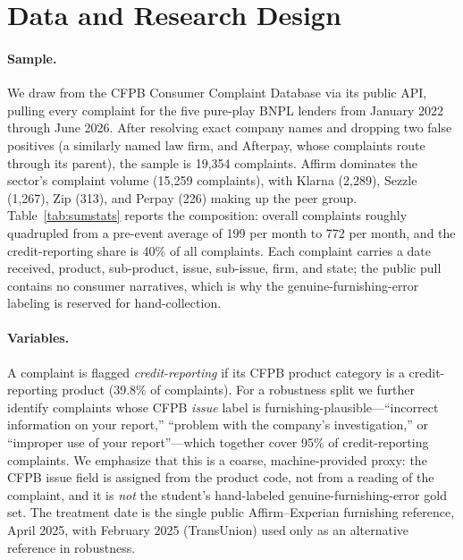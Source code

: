 \documentclass[12pt]{article}
\begin{document}
\section{Data and Research Design}\label{sec:data}
\paragraph{Sample.} We draw from the CFPB Consumer Complaint Database via its public API,
pulling every complaint for the five pure-play BNPL lenders from January 2022 through June
2026. After resolving exact company names and dropping two false positives (a similarly named
law firm, and Afterpay, whose complaints route through its parent), the sample is 19{,}354
complaints. Affirm dominates the sector's complaint volume (15{,}259 complaints), with Klarna
(2{,}289), Sezzle (1{,}267), Zip (313), and Perpay (226) making up the peer group.
Table~\ref{tab:sumstats} reports the composition: overall complaints roughly quadrupled from a
pre-event average of 199 per month to 772 per month, and the credit-reporting share is 40\% of
all complaints. Each complaint carries a date received, product, sub-product, issue, sub-issue,
firm, and state; the public pull contains no consumer narratives, which is why the
genuine-furnishing-error labeling is reserved for hand-collection.

\paragraph{Variables.} A complaint is flagged \emph{credit-reporting} if its CFPB product
category is a credit-reporting product (39.8\% of complaints). For a robustness split we further
identify complaints whose CFPB \emph{issue} label is furnishing-plausible---``incorrect
information on your report,'' ``problem with the company's investigation,'' or ``improper use of
your report''---which together cover 95\% of credit-reporting complaints. We emphasize that this
is a coarse, machine-provided proxy: the CFPB issue field is assigned from the product code, not
from a reading of the complaint, and it is \emph{not} the student's hand-labeled
genuine-furnishing-error gold set. The treatment date is the single public Affirm--Experian
furnishing reference, April 2025, with February 2025 (TransUnion) used only as an alternative
reference in robustness.
\end{document}
